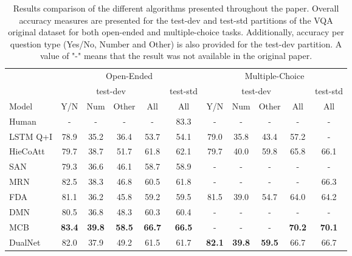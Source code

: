 \documentclass{article}
\begin{document}
    \begin{table}[ht]
    	\centering
    	\begin{tabular}{lcccccccccc}
    		\toprule
    		& \multicolumn{5}{c}{Open-Ended} & \multicolumn{5}{c}{Multiple-Choice}\\ 
    		\cmidrule(lr){2-6} \cmidrule(lr){7-11}
    		& \multicolumn{4}{c}{test-dev} & test-std & \multicolumn{4}{c}{test-dev} & test-std\\ 
    		\cmidrule(lr){2-5} \cmidrule(lr){6-6} \cmidrule(lr){7-10} \cmidrule(lr){11-11}
    		Model & Y/N & Num & Other & All & All & Y/N & Num & Other & All & All\\
    		\midrule
    		Human & - & - & - & - & 83.3 & - & - & - & - & - \\
    		LSTM Q+I \citep{iccvAntol15} & 78.9 & 35.2 & 36.4 & 53.7 & 54.1 & 79.0 & 35.8 & 43.4 & 57.2 & - \\
    		HieCoAtt \citep{nipsLu16} & 79.7 & 38.7 & 51.7 & 61.8 & 62.1 & 79.7 & 40.0 & 59.8 & 65.8 & 66.1 \\
    		SAN \citep{corrYang15} & 79.3 & 36.6 & 46.1 & 58.7 & 58.9 & - & - & - & - & - \\
    		MRN \citep{DBLP:corrKim16} & 82.5 & 38.3 & 46.8 & 60.5 & 61.8 & - & - & - & - & 66.3 \\
    		FDA \citep{corrIlievski16} & 81.1 & 36.2 & 45.8 & 59.2 & 59.5 & 81.5 & 39.0 & 54.7 & 64.0 & 64.2 \\
    		DMN \citep{corrXiong16} & 80.5 & 36.8 & 48.3 & 60.3 & 60.4 & - & - & - & - & - \\
    		MCB \citep{corrFukui16} & \textbf{83.4} & \textbf{39.8} & \textbf{58.5} & \textbf{66.7} & \textbf{66.5} & - & - & - & \textbf{70.2} & \textbf{70.1} \\
    		DualNet \citep{corrSaito16} & 82.0 & 37.9 & 49.2 & 61.5 & 61.7 & \textbf{82.1} & \textbf{39.8} & \textbf{59.5} & 66.7 & 66.7 \\
    		\bottomrule
    	\end{tabular}
    	\caption{Results comparison of the different algorithms presented throughout the paper. Overall accuracy measures are presented for the test-dev and test-std partitions of the VQA original dataset for both open-ended and multiple-choice tasks. Additionally, accuracy per question type (Yes/No, Number and Other) is also provided for the test-dev partition. A value of "-" means that the result was not available in the original paper.}
        \label{results}
    \end{table}
\end{document}
